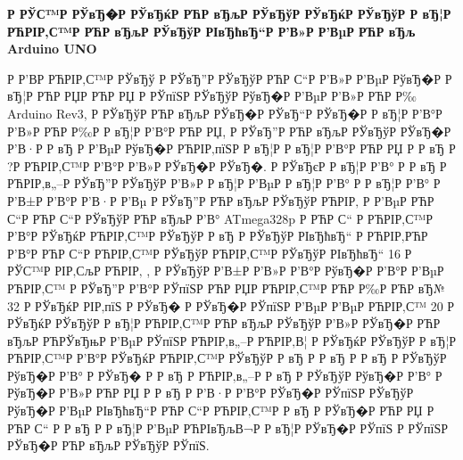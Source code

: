 \documentclass[a4paper,14pt]{extarticle}
\begin{document}
\centerline{\large \bfseries Р  РЎС™Р  РЎвЂ�Р  РЎвЂќР РЋР вЂљР  РЎвЂўР  РЎвЂќР  РЎвЂўР  Р вЂ¦Р РЋРІР‚С™Р РЋР вЂљР  РЎвЂўР  РІвЂћвЂ“Р  Р’В»Р  Р’ВµР РЋР вЂљ Arduino UNO}
	Р  Р’В­Р РЋРІР‚С™Р  РЎвЂў Р  РЎвЂ”Р  РЎвЂўР РЋР С“Р  Р’В»Р  Р’ВµР  РўвЂ�Р  Р вЂ¦Р РЋР РЏР РЋР РЏ Р  РЎпїЅР  РЎвЂўР  РўвЂ�Р  Р’ВµР  Р’В»Р РЋР Р‰ Arduino Rev3, Р  РЎвЂўР РЋР вЂљР  РЎвЂ�Р  РЎвЂ“Р  РЎвЂ�Р  Р вЂ¦Р  Р’В°Р  Р’В»Р РЋР Р‰Р  Р вЂ¦Р  Р’В°Р РЋР РЏ, Р  РЎвЂ”Р РЋР вЂљР  РЎвЂўР  РЎвЂ�Р  Р’В·Р  Р вЂ Р  Р’ВµР  РўвЂ�Р РЋРІР‚пїЅР  Р вЂ¦Р  Р вЂ¦Р  Р’В°Р РЋР РЏ Р  Р вЂ  Р  ?Р РЋРІР‚С™Р  Р’В°Р  Р’В»Р  РЎвЂ�Р  РЎвЂ�. Р  РЎвЂєР  Р вЂ¦Р  Р’В° Р  Р вЂ Р РЋРІР‚в„–Р  РЎвЂ”Р  РЎвЂўР  Р’В»Р  Р вЂ¦Р  Р’ВµР  Р вЂ¦Р  Р’В° Р  Р вЂ¦Р  Р’В° Р  Р’В±Р  Р’В°Р  Р’В·Р  Р’Вµ Р  РЎвЂ”Р РЋР вЂљР  РЎвЂўР РЋРІР‚ Р  Р’ВµР РЋР С“Р РЋР С“Р  РЎвЂўР РЋР вЂљР  Р’В° ATmega328p Р РЋР С“ Р РЋРІР‚С™Р  Р’В°Р  РЎвЂќР РЋРІР‚С™Р  РЎвЂўР  Р вЂ Р  РЎвЂўР  РІвЂћвЂ“ Р РЋРІР‚РЋР  Р’В°Р РЋР С“Р РЋРІР‚С™Р  РЎвЂўР РЋРІР‚С™Р  РЎвЂўР  РІвЂћвЂ“ 16 Р  РЎС™Р  РІР‚СљР РЋРІР‚ , Р  РЎвЂўР  Р’В±Р  Р’В»Р  Р’В°Р  РўвЂ�Р  Р’В°Р  Р’ВµР РЋРІР‚С™ Р  РЎвЂ”Р  Р’В°Р  РЎпїЅР РЋР РЏР РЋРІР‚С™Р РЋР Р‰Р РЋР вЂ№ 32 Р  РЎвЂќР  РІР‚пїЅ Р  РЎвЂ� Р  РЎвЂ�Р  РЎпїЅР  Р’ВµР  Р’ВµР РЋРІР‚С™ 20 Р  РЎвЂќР  РЎвЂўР  Р вЂ¦Р РЋРІР‚С™Р РЋР вЂљР  РЎвЂўР  Р’В»Р  РЎвЂ�Р РЋР вЂљР РЋРЎвЂњР  Р’ВµР  РЎпїЅР РЋРІР‚в„–Р РЋРІР‚В¦ 		Р  РЎвЂќР  РЎвЂўР  Р вЂ¦Р РЋРІР‚С™Р  Р’В°Р  РЎвЂќР РЋРІР‚С™Р  РЎвЂўР  Р вЂ  Р  Р вЂ Р  Р вЂ Р  РЎвЂўР  РўвЂ�Р  Р’В° Р  РЎвЂ� Р  Р вЂ Р РЋРІР‚в„–Р  Р вЂ Р  РЎвЂўР  РўвЂ�Р  Р’В° Р  РўвЂ�Р  Р’В»Р РЋР РЏ Р  Р вЂ Р  Р’В·Р  Р’В°Р  РЎвЂ�Р  РЎпїЅР  РЎвЂўР  РўвЂ�Р  Р’ВµР  РІвЂћвЂ“Р РЋР С“Р РЋРІР‚С™Р  Р вЂ Р  РЎвЂ�Р РЋР РЏ Р РЋР С“ Р  Р вЂ Р  Р вЂ¦Р  Р’ВµР РЋРІвЂљВ¬Р  Р вЂ¦Р  РЎвЂ�Р  РЎпїЅ Р  РЎпїЅР  РЎвЂ�Р РЋР вЂљР  РЎвЂўР  РЎпїЅ.
\end{document}
